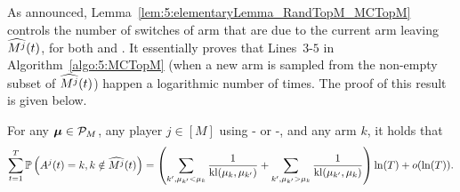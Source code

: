 



As announced, Lemma~\ref{lem:5:elementaryLemma_RandTopM_MCTopM} controls
the number of switches of arm that are due to the current arm leaving $\widehat{M^j}(t)$,
for both \RandTopM{} and \MCTopM{}. It essentially proves that Lines~$3$-$5$ in Algorithm~\ref{algo:5:MCTopM} (when a new arm is sampled from the non-empty subset of $\widehat{M^j}(t)$)
happen a logarithmic number of times. The proof of this result is given below.

\begin{lemma}\label{lem:5:elementaryLemma_RandTopM_MCTopM}
  For any $\boldsymbol{\mu}\in\mathcal{P}_M$,
  any player $j \in [M]$ using
  \RandTopM- or \MCTopM-\klUCB,
  and any arm $k$,
  it holds that
  \begin{equation*}
    \sum_{t=1}^T
    \mathbb{P}\left(A^j(t)=k, k\notin \widehat{M^j}(t)\right)
    = \left(\sum_{k', \mu_{k'} < \mu_k}\frac{1}{\mathrm{kl}(\mu_k,\mu_{k'})} + \sum_{k', \mu_{k'} > \mu_k}\frac{1}{\mathrm{kl}(\mu_{k'},\mu_{k})}\right) \ln(T) + o(\ln(T)).
  \end{equation*}
\end{lemma}


